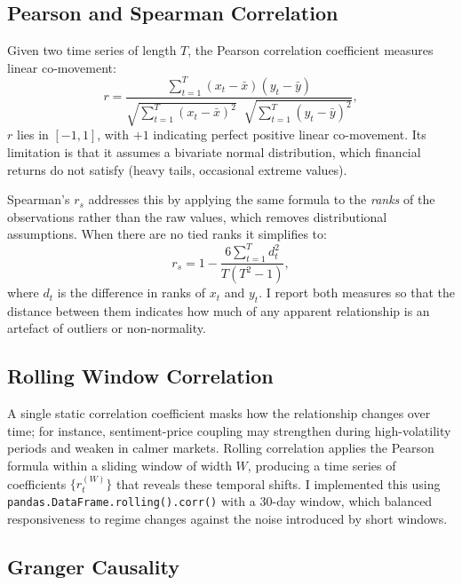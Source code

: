 \subsection{Pearson and Spearman Correlation}

Given two time series of length $T$, the Pearson correlation coefficient measures linear
co-movement:
\begin{equation}
  r = \frac{\sum_{t=1}^T (x_t - \bar{x})(y_t - \bar{y})}
           {\sqrt{\sum_{t=1}^T (x_t - \bar{x})^2}\;\;\sqrt{\sum_{t=1}^T (y_t - \bar{y})^2}},
  \label{eq:pearson}
\end{equation}
$r$ lies in $[-1, 1]$, with $+1$ indicating perfect positive linear co-movement.
Its limitation is that it assumes a bivariate normal distribution, which financial
returns do not satisfy (heavy tails, occasional extreme values).

Spearman's $r_s$ addresses this by applying the same formula to the \emph{ranks} of the
observations rather than the raw values, which removes distributional assumptions.
When there are no tied ranks it simplifies to:
\begin{equation}
  r_s = 1 - \frac{6\sum_{t=1}^T d_t^2}{T(T^2 - 1)},
  \label{eq:spearman}
\end{equation}
where $d_t$ is the difference in ranks of $x_t$ and $y_t$.
I report both measures so that the distance between them indicates how much of any
apparent relationship is an artefact of outliers or non-normality.

\subsection{Rolling Window Correlation}

A single static correlation coefficient masks how the relationship changes over time;
for instance, sentiment-price coupling may strengthen during high-volatility periods and
weaken in calmer markets.
Rolling correlation applies the Pearson formula within a sliding window of width $W$,
producing a time series of coefficients $\{r_t^{(W)}\}$ that reveals these temporal
shifts.
I implemented this using \texttt{pandas.DataFrame.rolling().corr()} with a 30-day window,
which balanced responsiveness to regime changes against the noise introduced by short
windows.

\subsection{Granger Causality}

